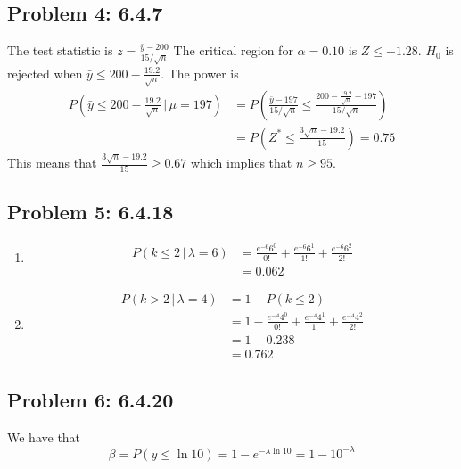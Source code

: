 \documentclass{article}
\begin{document}
\subsection*{Problem 4: 6.4.7}
The test statistic is $z = \frac{\bar{y}-200}{15/\sqrt{n}}$
The critical region for $\alpha = 0.10$ is $Z \leq -1.28$.
$H_0$ is rejected when $\bar{y} \leq 200 - \frac{19.2}{\sqrt{n}}$.
The power is 
\begin{align*}
	P(\bar{y} \leq 200 - \frac{19.2}{\sqrt{n}} \,|\, \mu = 197)
	&= P (\frac{\bar{y}-197}{15/\sqrt{n}} \leq \frac{200 - \frac{19.2}{\sqrt{n}}-197}{15/\sqrt{n}}) \\
	&= P(Z^* \leq \frac{3\sqrt{n}-19.2}{15}) = 0.75
\end{align*}
This means that $\frac{3\sqrt{n}-19.2}{15} \geq 0.67$
which implies that $n \geq 95$.
\newpage 

\subsection*{Problem 5: 6.4.18}
\begin{enumerate}
	\item \begin{align*}
		P(k \leq 2 \,|\, \lambda=6) 
		&= \frac{e^{-6}6^0}{0!} +\frac{e^{-6}6^1}{1!} + \frac{e^{-6}6^2}{2!} \\
		&= 0.062
	\end{align*}
	\item \begin{align*}
		P(k > 2 \,|\, \lambda=4) 
		&= 1 - P (k \leq 2) \\
		&= 1- \frac{e^{-4}4^0}{0!} +\frac{e^{-4}4^1}{1!} + \frac{e^{-4}4^2}{2!} \\
		&= 1- 0.238 \\
		&= 0.762
	\end{align*}
\end{enumerate}
\newpage 

\subsection*{Problem 6: 6.4.20}
We have that 
\[
	\beta = P(y \leq \ln 10)  =1- e^{-\lambda \ln 10} = 1- 10^{-\lambda}	
\]
\newpage
\end{document}
